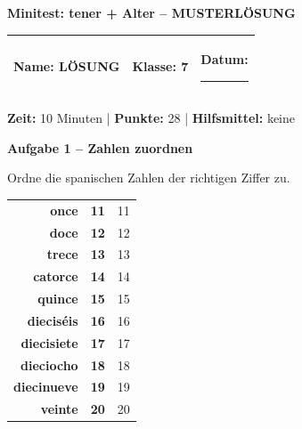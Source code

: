 \documentclass[11pt, a4paper]{article}
\newcommand{\fachfarbe}{spanisch}
\newcommand{\thema}{Minitest: tener + Alter -- MUSTERLÖSUNG}
\newcommand{\klasse}{7}
\newcommand{\maxpunkte}{28}
\newcommand{\zeit}{10 Minuten}
\newcommand{\punktebox}[1]{\hfill\fbox{\small \_/#1}}
\newcommand{\luecke}[1]{\rule{#1}{0.4pt}}
\newcommand{\lsg}[1]{\textcolor{loesung}{\textbf{#1}}}
\newenvironment{aufgabe}[1]{%
    \needspace{5\baselineskip}%
    \nopagebreak[4]%
    \vspace{10pt}
    \noindent\textbf{\textcolor{\fachfarbe}{Aufgabe #1}}
    \nopagebreak[4]%
    \vspace{5pt}
    \nopagebreak[4]%
    \begin{list}{}{\leftmargin=0pt}
    \item[]
}{%
    \end{list}
}
\newcommand{\es}[1]{\textcolor{\fachfarbe}{\textbf{#1}}}
\begin{document}

\begin{center}
    {\Large\bfseries\textcolor{\fachfarbe}{\thema}}
\end{center}

\vspace{5pt}

\noindent
\begin{tabularx}{\textwidth}{|X|X|X|}
\hline
\textbf{Name:} \lsg{LÖSUNG} &
\textbf{Klasse:} \klasse &
\textbf{Datum:} \luecke{2cm} \\
\hline
\end{tabularx}

\vspace{10pt}

\begin{infobox}
\textbf{Zeit:} \zeit{} | \textbf{Punkte:} \maxpunkte{} | \textbf{Hilfsmittel:} keine
\end{infobox}

\vspace{15pt}


\begin{aufgabe}{1 -- Zahlen zuordnen}
Ordne die spanischen Zahlen der richtigen Ziffer zu. \punktebox{10}
\end{aufgabe}

\begin{center}
\begin{tabular}{rcl}
\es{once} & \lsg{11} & 11 \\[0.6em]
\es{doce} & \lsg{12} & 12 \\[0.6em]
\es{trece} & \lsg{13} & 13 \\[0.6em]
\es{catorce} & \lsg{14} & 14 \\[0.6em]
\es{quince} & \lsg{15} & 15 \\[0.6em]
\es{dieciséis} & \lsg{16} & 16 \\[0.6em]
\es{diecisiete} & \lsg{17} & 17 \\[0.6em]
\es{dieciocho} & \lsg{18} & 18 \\[0.6em]
\es{diecinueve} & \lsg{19} & 19 \\[0.6em]
\es{veinte} & \lsg{20} & 20 \\
\end{tabular}
\end{center}
\end{document}
